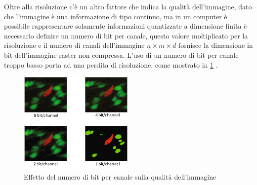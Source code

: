 Oltre alla risoluzione c'è un altro fattore che indica la qualità dell'immagine, dato che l'immagine è una informazione di tipo continuo, ma in un computer è possibile rappresentare solamente informazioni quantizzate a dimensione finita è necessario definire un numero di bit per canale, questo valore moltiplicato per la risoluzione e il numero di canali dell'immagine  \(n\times m \times d\) fornisce la dimensione in bit dell'immagine raster non compressa. L'uso di un numero di bit per canale  troppo basso porta ad una perdita di risoluzione, come mostrato in \cref{fig:bit-channel}  \cite{gonzalez_dip} \cite{spaepen_resolution}.

\begin{figure}[ht]
    \centering
    \includegraphics[width=0.5\textwidth]{frame/bit-channel.png}
    \caption{Effetto del numero di bit per canale sulla qualità dell'immagine}
    \label{fig:bit-channel}
\end{figure}